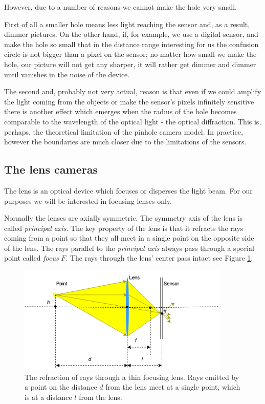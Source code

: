 \documentclass[a4paper,10pt]{article}
\begin{document}
However, due to a number of reasons we cannot make the hole very small.

First of all a smaller hole means less light reaching the sensor and, as a result,  dimmer pictures. On the other hand, if, for example,  we use a digital sensor, and  make the hole so small that in the distance range interesting for us the confusion circle is not bigger than a pixel on the sensor; no matter how small we make the hole, our picture will not get any sharper, it will rather get dimmer and dimmer until vanishes in the noise of the device.

The second and, probably not very actual, reason is that even if we could amplify the light coming from the objects or make the sensor's pixels infinitely sensitive there is another effect which emerges when the radius of the hole becomes comparable to the wavelength of the optical light - the optical diffraction. This is, perhaps, the theoretical limitation of the pinhole camera model. In practice, however the boundaries are much closer due to the limitations of the sensors. 

\subsection{The lens cameras}

The lens is an optical device which focuses or disperses the light beam. For our purposes we will be interested in focusing lenses only. 

Normally the lenses are axially symmetric. The symmetry axis of the lens is called  {\it principal axis}. The key property of the lens is that it refracts the rays coming from a point so that they all meet in a single point on the opposite side of the lens. The rays parallel to the {\it principal axis} always pass through a special point called {\it focus} $F$. The rays through the lens' center pass intact see Figure \ref{fig:lens}.

\begin{figure}[h]
\centering
 \includegraphics[width=0.9\textwidth]{../../images/lens.png}
 \caption{The refraction of rays through a thin focusing lens. Rays emitted by a point on the distance $d$ from the lens meet at a single point, which is at a distance $l$ from the lens.}
 \label{fig:lens}
\end{figure}
\end{document}
